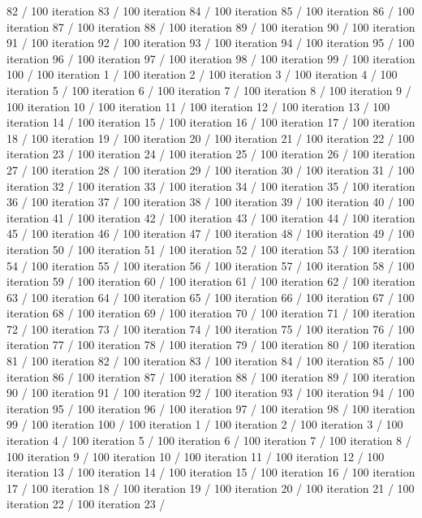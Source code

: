 82 / 100 iteration 83 / 100 iteration 84 / 100 iteration 85 / 100
iteration 86 / 100 iteration 87 / 100 iteration 88 / 100 iteration 89 /
100 iteration 90 / 100 iteration 91 / 100 iteration 92 / 100 iteration
93 / 100 iteration 94 / 100 iteration 95 / 100 iteration 96 / 100
iteration 97 / 100 iteration 98 / 100 iteration 99 / 100 iteration 100 /
100 iteration 1 / 100 iteration 2 / 100 iteration 3 / 100 iteration 4 /
100 iteration 5 / 100 iteration 6 / 100 iteration 7 / 100 iteration 8 /
100 iteration 9 / 100 iteration 10 / 100 iteration 11 / 100 iteration 12
/ 100 iteration 13 / 100 iteration 14 / 100 iteration 15 / 100 iteration
16 / 100 iteration 17 / 100 iteration 18 / 100 iteration 19 / 100
iteration 20 / 100 iteration 21 / 100 iteration 22 / 100 iteration 23 /
100 iteration 24 / 100 iteration 25 / 100 iteration 26 / 100 iteration
27 / 100 iteration 28 / 100 iteration 29 / 100 iteration 30 / 100
iteration 31 / 100 iteration 32 / 100 iteration 33 / 100 iteration 34 /
100 iteration 35 / 100 iteration 36 / 100 iteration 37 / 100 iteration
38 / 100 iteration 39 / 100 iteration 40 / 100 iteration 41 / 100
iteration 42 / 100 iteration 43 / 100 iteration 44 / 100 iteration 45 /
100 iteration 46 / 100 iteration 47 / 100 iteration 48 / 100 iteration
49 / 100 iteration 50 / 100 iteration 51 / 100 iteration 52 / 100
iteration 53 / 100 iteration 54 / 100 iteration 55 / 100 iteration 56 /
100 iteration 57 / 100 iteration 58 / 100 iteration 59 / 100 iteration
60 / 100 iteration 61 / 100 iteration 62 / 100 iteration 63 / 100
iteration 64 / 100 iteration 65 / 100 iteration 66 / 100 iteration 67 /
100 iteration 68 / 100 iteration 69 / 100 iteration 70 / 100 iteration
71 / 100 iteration 72 / 100 iteration 73 / 100 iteration 74 / 100
iteration 75 / 100 iteration 76 / 100 iteration 77 / 100 iteration 78 /
100 iteration 79 / 100 iteration 80 / 100 iteration 81 / 100 iteration
82 / 100 iteration 83 / 100 iteration 84 / 100 iteration 85 / 100
iteration 86 / 100 iteration 87 / 100 iteration 88 / 100 iteration 89 /
100 iteration 90 / 100 iteration 91 / 100 iteration 92 / 100 iteration
93 / 100 iteration 94 / 100 iteration 95 / 100 iteration 96 / 100
iteration 97 / 100 iteration 98 / 100 iteration 99 / 100 iteration 100 /
100 iteration 1 / 100 iteration 2 / 100 iteration 3 / 100 iteration 4 /
100 iteration 5 / 100 iteration 6 / 100 iteration 7 / 100 iteration 8 /
100 iteration 9 / 100 iteration 10 / 100 iteration 11 / 100 iteration 12
/ 100 iteration 13 / 100 iteration 14 / 100 iteration 15 / 100 iteration
16 / 100 iteration 17 / 100 iteration 18 / 100 iteration 19 / 100
iteration 20 / 100 iteration 21 / 100 iteration 22 / 100 iteration 23 /
